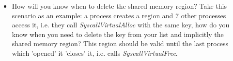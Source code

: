 \begin{enumerate}
\begin{itemize}
						\item How will you know when to delete the shared memory region? Take this scenario as an example: a process creates a region and 7 other processes access it, i.e. they call \textit{SyscallVirtualAlloc} with the same key, how do you know when you need to delete the key from your list and implicitly the shared memory region? This region should be valid until the last process which 'opened' it 'closes' it, i.e. calls \textit{SyscallVirtualFree}.
        \end{itemize}

\end{enumerate}
